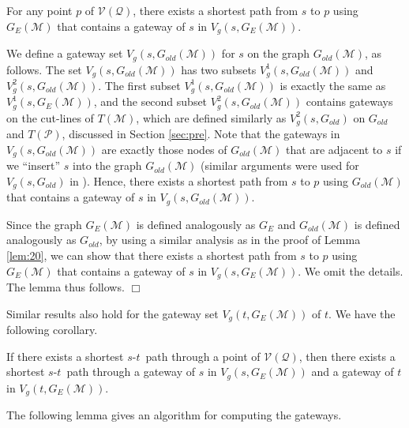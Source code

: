 \documentclass[english,runningheads,11pt]{llncs}
\def\calP{\mathcal{P}}
\def\calM{\mathcal{M}}
\def\calQ{\mathcal{Q}}
\def\calV{\mathcal{V}}
\def\st{$s$-$t$}
\newenvironment{proof}{\noindent {\textbf{Proof:}}\rm}{\hfill $\Box$\rm}
\begin{document}
\begin{lemma}\label{lem:60}
For any point $p$ of $\calV(\calQ)$, there exists a shortest path from
$s$ to $p$ using $G_E(\calM)$ that contains a gateway of $s$ in
$V_g(s,G_E(\calM))$.
\end{lemma}
\begin{proof}
We define a gateway set $V_g(s,G_{old}(\calM))$ for $s$ on the graph
$G_{old}(\calM)$, as follows. The set $V_g(s,G_{old}(\calM))$
has two subsets $V^1_g(s,G_{old}(\calM))$ and
$V^2_g(s,G_{old}(\calM))$. The first subset $V^1_g(s,G_{old}(\calM))$
is exactly the same as $V^1_g(s,G_E(\calM))$, and the second subset
$V^2_g(s,G_{old}(\calM))$ contains gateways on the cut-lines of
$T(\calM)$, which are defined similarly as $V^2_g(s,G_{old})$ on
$G_{old}$ and $T(\calP)$, discussed in Section \ref{sec:pre}. Note
that the gateways in $V_g(s,G_{old}(\calM))$ are exactly those nodes
of $G_{old}(\calM)$ that are adjacent to $s$ if we ``insert'' $s$
into the graph $G_{old}(\calM)$ (similar arguments were used for
$V_g(s,G_{old})$ in \cite{ref:ChenSh00}). Hence, there exists a
shortest path from $s$ to $p$ using $G_{old}(\calM)$ that contains a
gateway of $s$ in $V_g(s,G_{old}(\calM))$.

Since the graph $G_E(\calM)$ is defined analogously as $G_E$ and
$G_{old}(\calM)$ is defined analogously as $G_{old}$, by using a similar
analysis as in the proof of Lemma \ref{lem:20}, we can show that there
exists a shortest path from $s$ to $p$ using $G_E(\calM)$ that contains a
gateway of $s$ in $V_g(s,G_E(\calM))$. We omit the details. The
lemma thus follows.
\end{proof}

Similar results also hold for the gateway set $V_g(t,G_E(\calM))$ of $t$.
We have the following corollary.

\begin{corollary}\label{cor:20}
If there exists a shortest \st\ path through a point of
$\calV(\calQ)$, then there exists a shortest \st\ path through a gateway of
$s$ in $V_g(s,G_E(\calM))$ and a gateway of $t$ in $V_g(t,G_E(\calM))$.
\end{corollary}

The following lemma gives an algorithm for computing the gateways.
\end{document}
